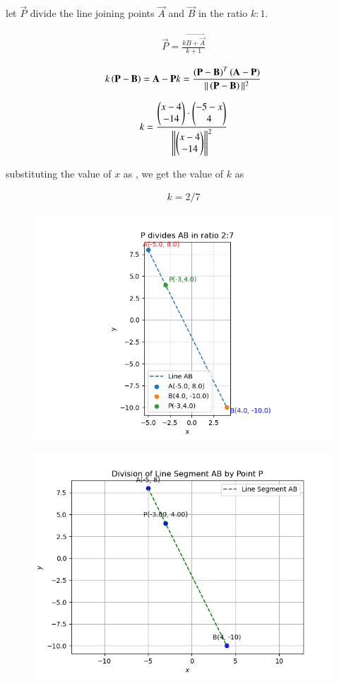 \documentclass[journal]{IEEEtran}
\begin{document}
let $\vec{P}$ divide the line joining points $\vec{A}$ and $\vec{B}$ in the ratio $k:1$.

\begin{align*}
    \vec{P}=\frac{k\vec{B+\vec{A}}}{k+1}
\end{align*}

\begin{align*}
    k\left(\mathbf{P}- \mathbf{B}\right) = \mathbf{A}-\mathbf{P}
k=\frac{\left(\mathbf{P}-\mathbf{B}\right)^T\left(\mathbf{A}-\mathbf{P}\right)}{||\left(\mathbf{P}-\mathbf{B}\right)||^2}    
\end{align*}

\begin{align*}
    k=\frac{\begin{pmatrix}x-4 \\ -14\end{pmatrix} \cdot \begin{pmatrix}-5-x\\4\end{pmatrix}}{{\left\lVert\begin{pmatrix}x-4 \\ -14\end{pmatrix}\right\rVert}^2}
\end{align*}

substituting the value of $x$ as , we get the value of $k$ as

\begin{align*}
    k=2/7
\end{align*}

\begin{figure}[H]
    \centering
    \includegraphics[width=0.6\columnwidth]{figs/Figure.png}
\end{figure}

\begin{figure}[H]
    \centering
    \includegraphics[width=0.6\columnwidth]{figs/Figure_1.png}
\end{figure}
\end{document}
